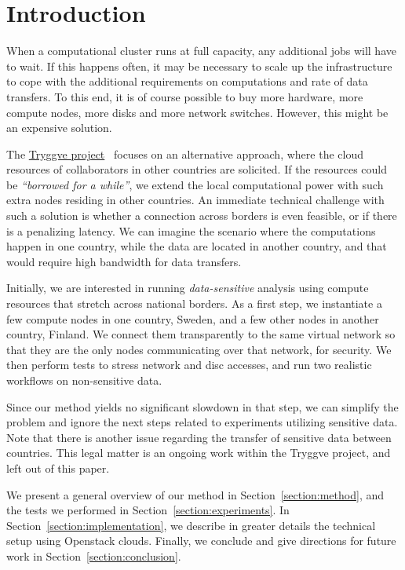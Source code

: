 \section{Introduction}
\label{section:intro}

When a computational cluster runs at full capacity, any additional jobs will
have to wait. If this happens often, it may be necessary to scale up
the infrastructure to cope with the additional requirements on computations and rate of data transfers. To
this end, it is of course possible to buy more hardware, \ie more
compute nodes, more disks and more network switches. However, this
might be an expensive solution.

The \href{https://wiki.neic.no/wiki/Tryggve}{Tryggve
  project}~\cite{tryggve} focuses on an alternative
approach, where the cloud resources of collaborators in other countries are solicited.
%
If the resources could be \emph{``borrowed for a while''}, we extend the local
computational power with such extra nodes residing in other countries.
%
An immediate technical challenge with such a solution is whether a
connection across borders is even feasible, or if there is a
penalizing latency. We can imagine the scenario where the computations
happen in one country, while the data are located in another country,
and that would require high bandwidth for data transfers.

Initially, we are interested in running \emph{data-sensitive}
analysis using compute resources that stretch across national borders.
%
As a first step, we instantiate a few compute nodes in one country,
Sweden, and a few other nodes in another country, Finland. We
connect them transparently to the same virtual network so that they are
the only nodes communicating over that network, for security. We then
perform tests to stress network and disc accesses, and run two
realistic workflows on non-sensitive data.

Since our method yields no significant slowdown in that step, we
can simplify the problem and ignore the next steps related to
experiments utilizing sensitive data.
%
Note that there is another issue regarding the transfer of sensitive
data between countries. This legal matter is an ongoing work within
the Tryggve project, and left out of this paper.

We present a general overview of our method in
Section~\ref{section:method}, and the tests we performed in
Section~\ref{section:experiments}.
%
In Section~\ref{section:implementation}, we describe in greater
details the technical setup using Openstack clouds.
%
Finally, we conclude and give directions for future work in
Section~\ref{section:conclusion}.
